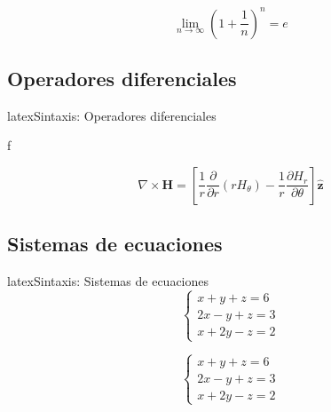 \begin{equation}
  \lim_{n \to \infty} \left(1 + \frac{1}{n}\right)^n = e
  \label{eq:euler}
\end{equation}

\subsection{Operadores diferenciales}
\label{subsec:operadores-diferenciales}

\begin{codigosimple}{latex}{Sintaxis: Operadores diferenciales}

\nabla f                   %
\nabla \cdot {}    %
\nabla \times {}   %
\end{codigosimple}

\begin{equation}
  \nabla \times \mathbf{H} = \left[ \frac{1}{r} \frac{\partial}{\partial r}(r H_\theta) - \frac{1}{r} \frac{\partial H_r}{\partial \theta} \right] \hat{\mathbf{z}}
  \label{eq:maxwell}
\end{equation}

\subsection{Sistemas de ecuaciones}
\label{subsec:sistemas-ecuaciones}

\begin{codigosimple}{latex}{Sintaxis: Sistemas de ecuaciones}
\begin{equation}
  \begin{cases}
    x + y + z = 6 \\
    2x - y + z = 3 \\
    x + 2y - z = 2
  \end{cases}
\end{equation}
\end{codigosimple}

\begin{equation}
  \begin{cases}
    x + y + z = 6 \\
    2x - y + z = 3 \\
    x + 2y - z = 2
  \end{cases}
  \label{eq:sistema}
\end{equation}

